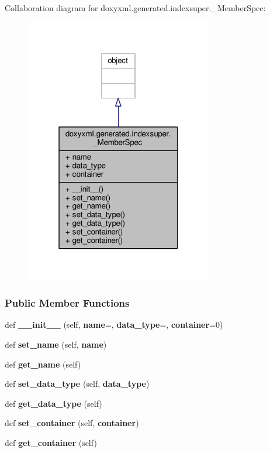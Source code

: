 Collaboration diagram for doxyxml.\+generated.\+indexsuper.\+\_\+\+Member\+Spec\+:
\nopagebreak
\begin{figure}[H]
\begin{center}
\leavevmode
\includegraphics[width=232pt]{d5/dc6/classdoxyxml_1_1generated_1_1indexsuper_1_1__MemberSpec__coll__graph}
\end{center}
\end{figure}
\subsubsection*{Public Member Functions}
\begin{DoxyCompactItemize}
\item 
def {\bf \+\_\+\+\_\+init\+\_\+\+\_\+} (self, {\bf name}=\textquotesingle{}\textquotesingle{}, {\bf data\+\_\+type}=\textquotesingle{}\textquotesingle{}, {\bf container}=0)
\item 
def {\bf set\+\_\+name} (self, {\bf name})
\item 
def {\bf get\+\_\+name} (self)
\item 
def {\bf set\+\_\+data\+\_\+type} (self, {\bf data\+\_\+type})
\item 
def {\bf get\+\_\+data\+\_\+type} (self)
\item 
def {\bf set\+\_\+container} (self, {\bf container})
\item 
def {\bf get\+\_\+container} (self)
\end{DoxyCompactItemize}
